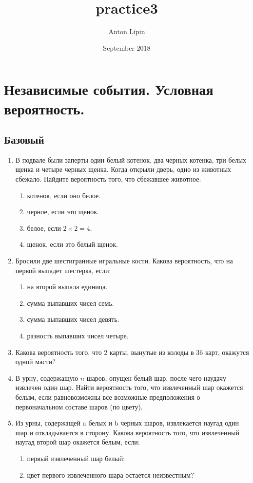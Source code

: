 \documentclass[a4paper, 14pt]{extarticle}
\title{practice3}
\author{Anton Lipin}
\date{September 2018}
\begin{document}
\section*{Независимые события. Условная вероятность.}
\subsection*{Базовый}
\begin{enumerate}
\item В подвале были заперты один белый котенок, два черных котенка, три белых щенка и четыре черных щенка. Когда открыли дверь, одно из животных сбежало. Найдите вероятность того, что сбежавшее животное:
\begin{enumerate}
  \item котенок, если оно белое.
  \item черное, если это щенок.
  \item белое, если $2\times 2=4$.
  \item щенок, если это белый щенок.
\end{enumerate}

\item Бросили две шестигранные игральные кости. Какова вероятность, что на первой выпадет шестерка, если:
\begin{enumerate}
  \item на второй выпала единица.
  \item сумма выпавших чисел семь.
  \item сумма выпавших чисел девять.
  \item разность выпавших чисел четыре.
\end{enumerate}

\item Какова вероятность того, что 2 карты, вынутые из колоды в 36 карт, окажутся одной масти?

\item В урну, содержащую $n$ шаров, опущен белый шар, после чего наудачу извлечен один шар. Найти вероятность того, что извлеченный шар окажется белым, если равновозможны все возможные предположения о первоначальном составе шаров (по цвету).

\item Из урны, содержащей a белых и b черных шаров, извлекается наугад один
шар и откладывается в сторону. Какова вероятность того, что извлеченный
наугад второй шар окажется белым, если:
\begin{enumerate}
  \item первый извлеченный шар белый;
  \item цвет первого извлеченного шара остается неизвестным?
\end{enumerate}


\end{enumerate}
\end{document}
